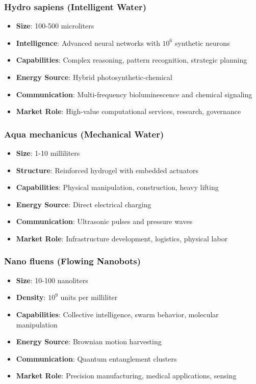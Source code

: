 \documentclass[11pt,a4paper]{article}
\begin{document}
\subsubsection{Hydro sapiens (Intelligent Water)}
\begin{itemize}
    \item \textbf{Size}: 100-500 microliters
    \item \textbf{Intelligence}: Advanced neural networks with $10^6$ synthetic neurons
    \item \textbf{Capabilities}: Complex reasoning, pattern recognition, strategic planning
    \item \textbf{Energy Source}: Hybrid photosynthetic-chemical
    \item \textbf{Communication}: Multi-frequency bioluminescence and chemical signaling
    \item \textbf{Market Role}: High-value computational services, research, governance
\end{itemize}

\subsubsection{Aqua mechanicus (Mechanical Water)}
\begin{itemize}
    \item \textbf{Size}: 1-10 milliliters
    \item \textbf{Structure}: Reinforced hydrogel with embedded actuators
    \item \textbf{Capabilities}: Physical manipulation, construction, heavy lifting
    \item \textbf{Energy Source}: Direct electrical charging
    \item \textbf{Communication}: Ultrasonic pulses and pressure waves
    \item \textbf{Market Role}: Infrastructure development, logistics, physical labor
\end{itemize}

\subsubsection{Nano fluens (Flowing Nanobots)}
\begin{itemize}
    \item \textbf{Size}: 10-100 nanoliters
    \item \textbf{Density}: $10^9$ units per milliliter
    \item \textbf{Capabilities}: Collective intelligence, swarm behavior, molecular manipulation
    \item \textbf{Energy Source}: Brownian motion harvesting
    \item \textbf{Communication}: Quantum entanglement clusters
    \item \textbf{Market Role}: Precision manufacturing, medical applications, sensing
\end{itemize}
\end{document}

